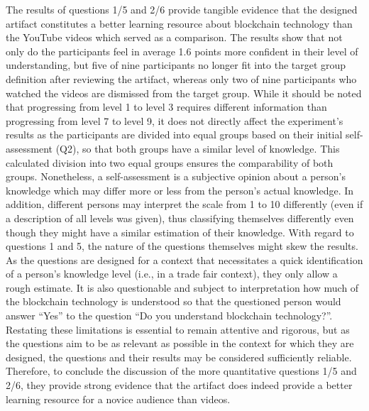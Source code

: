 The results of questions 1/5 and 2/6 provide tangible evidence that the designed artifact constitutes a better learning resource about blockchain technology than the YouTube videos which served as a comparison. The results show that not only do the participants feel in average 1.6 points more confident in their level of understanding, but five of nine participants no longer fit into the target group definition after reviewing the artifact, whereas only two of nine participants who watched the videos are dismissed from the target group. While it should be noted that progressing from level 1 to level 3 requires different information than progressing from level 7 to level 9, it does not directly affect the experiment's results as the participants are divided into equal groups based on their initial self-assessment (Q2), so that both groups have a similar level of knowledge. This calculated division into two equal groups ensures the comparability of both groups. Nonetheless, a self-assessment is a subjective opinion about a person's knowledge which may differ more or less from the person's actual knowledge. In addition, different persons may interpret the scale from 1 to 10 differently (even if a description of all levels was given), thus classifying themselves differently even though they might have a similar estimation of their knowledge. With regard to questions 1 and 5, the nature of the questions themselves might skew the results. As the questions are designed for a context that necessitates a quick identification of a person's knowledge level (i.e., in a trade fair context), they only allow a rough estimate. It is also questionable and subject to interpretation how much of the blockchain technology is understood so that the questioned person would answer \enquote{Yes} to the question \enquote{Do you understand blockchain technology?}. Restating these limitations is essential to remain attentive and rigorous, but as the questions aim to be as relevant as possible in the context for which they are designed, the questions and their results may be considered sufficiently reliable. Therefore, to conclude the discussion of the more quantitative questions 1/5 and 2/6, they provide strong evidence that the artifact does indeed provide a better learning resource for a novice audience than videos.

